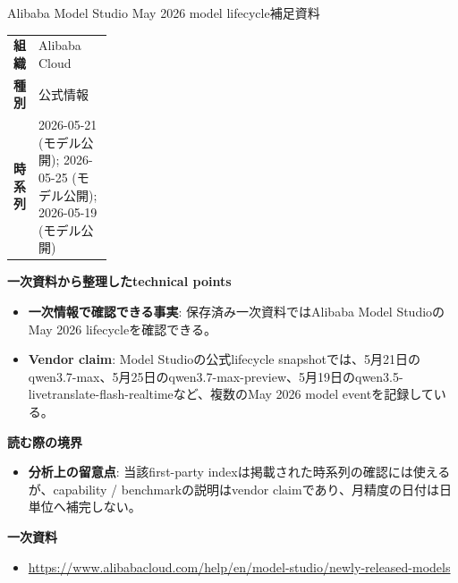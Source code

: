 \begin{technicalnote}{Alibaba Model Studio May 2026 model lifecycle}{補足資料}
\begingroup
\begin{tabularx}{\linewidth}{@{}>{\bfseries}p{0.22\linewidth}X@{}}
組織 & Alibaba Cloud \\
種別 & 公式情報 \\
時系列 & 2026-05-21 (モデル公開); 2026-05-25 (モデル公開); 2026-05-19 (モデル公開) \\
\end{tabularx}
\smallskip
{\bfseries 一次資料から整理したtechnical points}
\begin{itemize}[leftmargin=1.5em,itemsep=0.35em]
\item \textbf{一次情報で確認できる事実}: 保存済み一次資料ではAlibaba Model StudioのMay 2026 lifecycleを確認できる。
\end{itemize}
\begin{minipage}{\linewidth}
\begin{itemize}[leftmargin=1.5em,itemsep=0.35em]
\item \textbf{Vendor claim}: Model Studioの公式lifecycle snapshotでは、5月21日のqwen3.7-max、5月25日のqwen3.7-max-preview、5月19日のqwen3.5-livetranslate-flash-realtimeなど、複数のMay 2026 model eventを記録している。
\end{itemize}
{\bfseries 読む際の境界}
\begin{itemize}[leftmargin=1.5em,itemsep=0.35em]
\item \textbf{分析上の留意点}: 当該first-party indexは掲載された時系列の確認には使えるが、capability / benchmarkの説明はvendor claimであり、月精度の日付は日単位へ補完しない。
\end{itemize}
\begin{samepage}
{\bfseries 一次資料}
\begingroup\sloppy
\begin{itemize}[leftmargin=1.5em,itemsep=0.25em]
\item {\scriptsize\url{https://www.alibabacloud.com/help/en/model-studio/newly-released-models}}
\end{itemize}
\endgroup
\end{samepage}
\end{minipage}
\endgroup
\end{technicalnote}
\medskip


